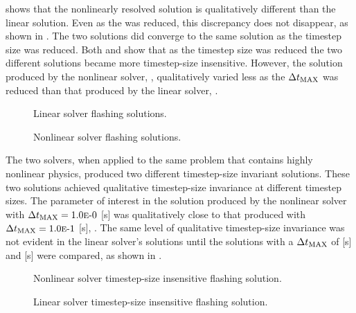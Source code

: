  shows that the nonlinearly resolved solution is qualitatively different than the linear solution.
Even as the \dtmax{} was reduced, this discrepancy does not disappear, as shown in .
The two solutions did converge to the same solution as the timestep size was reduced.
Both  and  show that as the timestep size was reduced the two different solutions became more timestep-size insensitive.
However, the solution produced by the nonlinear solver, , qualitatively varied less as the $\dtmax{}$ was reduced than that produced by the linear solver, .

\begin{figure}[h!tb]
\centering

\caption{Linear solver flashing solutions.}
\label{fig:flashingAlphaLin}
\end{figure}

\begin{figure}[h!tb]
\centering

\caption{Nonlinear solver flashing solutions.}
\label{fig:flashingAlphaNln}
\end{figure}

The two solvers, when applied to the same problem that contains highly nonlinear physics, produced two different timestep-size invariant solutions.
These two solutions achieved qualitative timestep-size invariance at different timestep sizes.
The parameter of interest in the solution produced by the nonlinear solver with $\dtmax{} = \expneg{1.0}{0}$ [s] was qualitatively close to that produced with $\dtmax{} = \expneg{1.0}{1}$ [s], .
The same level of qualitative timestep-size invariance was not evident in the linear solver's solutions until the solutions with a $\dtmax{}$ of  [s] and  [s] were compared, as shown in .

\begin{figure}[h!tb]
\centering

\caption{Nonlinear solver timestep-size insensitive flashing solution.}
\label{fig:flashingDtInsensitiveNln}
\end{figure}

\begin{figure}[h!tb]
\centering

\caption{Linear solver timestep-size insensitive flashing solution.}
\label{fig:flashingDtInsensitiveLin}
\end{figure}

